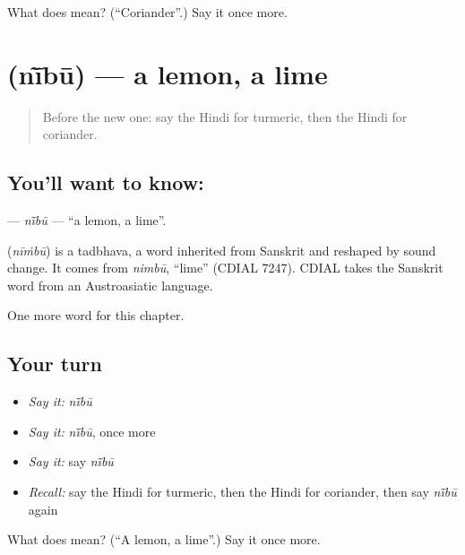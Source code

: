 \begin{tcolorbox}[breakable,colback=teal!4,colframe=teal!35!black,title={Before you move on}]
What does  mean? (\textquotedblleft{}Coriander\textquotedblright{}.) Say it once more.
\end{tcolorbox}
\section[\texorpdfstring{\hi{नींबू} (nī̃bū)}{नींबू (nī̃bū)}]{ (nī̃bū) — a lemon, a lime}

\label{lesson:HI-C211-nibu}



\begin{quote}
Before the new one: say the Hindi for turmeric, then the Hindi for coriander.
\end{quote}

\subsection*{You'll want to know: }
\textbf{} — \emph{nī̃bū} — \textquotedblleft{}a lemon, a lime\textquotedblright{}.

\begin{cousinweb}
\textbf{} (\emph{nīṁbū}) is a tadbhava, a word inherited from Sanskrit and reshaped by sound change. It comes from \emph{nimbū}, \textquotedblleft{}lime\textquotedblright{} (CDIAL 7247). CDIAL takes the Sanskrit word from an Austroasiatic language.
\end{cousinweb}

\begin{grammarlens}[title={What you've built}]
One more word for this chapter.
\end{grammarlens}

\subsection*{Your turn}
\begin{itemize}
\raggedright
  \item \emph{Say it:} \emph{nī̃bū}
  \item \emph{Say it:} \emph{nī̃bū}, once more
  \item \emph{Say it:} say \emph{nī̃bū}
  \item \emph{Recall:} say the Hindi for turmeric, then the Hindi for coriander, then say \emph{nī̃bū} again
\end{itemize}

\begin{tcolorbox}[breakable,colback=teal!4,colframe=teal!35!black,title={Before you move on}]
What does  mean? (\textquotedblleft{}A lemon, a lime\textquotedblright{}.) Say it once more.
\end{tcolorbox}
